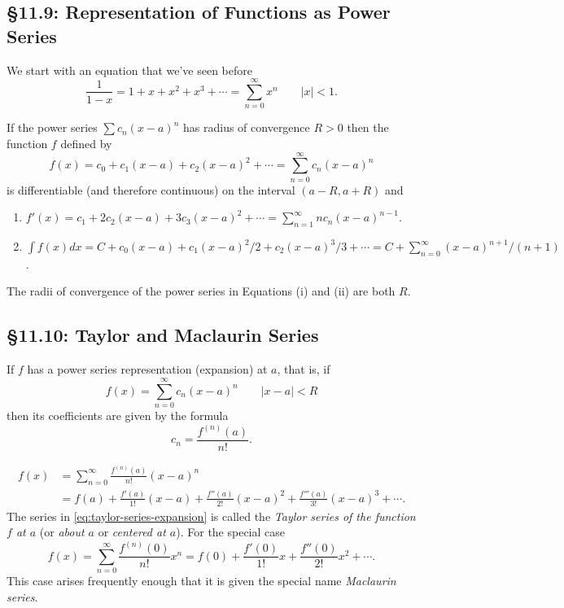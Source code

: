 \subsection{\S 11.9: Representation of Functions as Power Series}
We start with an equation that we've seen before
\begin{equation}
\label{eq:geometri-series-representation}
\frac{1}{1-x}=1+x+x^2+x^3+\dotsb=\sum_{n=0}^\infty x^n\qquad |x|<1.
\end{equation}
\begin{theorem}
If the power series $\sum c_n(x-a)^n$ has radius of convergence $R>0$ then
the function $f$ defined by
\[
f(x)=c_0+c_1(x-a)+c_2(x-a)^2+\dotsb=\sum_{n=0}^\infty c_n(x-a)^n
\]
is differentiable (and therefore continuous) on the interval $(a-R,a+R)$
and
\begin{enumerate}[label=\textnormal{(\roman*)}]
\item $f'(x)=c_1+2c_2(x-a)+3c_3(x-a)^2+\dotsb=\sum_{n=1}^\infty
  nc_n(x-a)^{n-1}$.
\item $\int
  f(x)dx=C+c_0(x-a)+c_1(x-a)^2/2+c_2(x-a)^3/3+\dotsb=C+\sum_{n=0}^\infty
  (x-a)^{n+1}/(n+1)$.
\end{enumerate}
The radii of convergence of the power series in Equations (i) and (ii) are
both $R$.
\end{theorem}

\subsection{\S 11.10: Taylor and Maclaurin Series}
\begin{theorem}
If $f$ has a power series representation (expansion) at $a$, that is, if
\[
f(x)=\sum_{n=0}^\infty c_n(x-a)^n\qquad |x-a|<R
\]
then its coefficients are given by the formula
\[
c_n=\frac{f^{(n)}(a)}{n!}.
\]
\end{theorem}

\begin{equation}
\label{eq:taylor-series-expansion}
\begin{aligned}
f(x)&=\sum_{n=0}^\infty\frac{f^{(n)}(a)}{n!}(x-a)^n\\
&=f(a)+\frac{f'(a)}{1!}(x-a)+\frac{f''(a)}{2!}(x-a)^2+\frac{f'''(a)}{3!}(x-a)^3+\dotsb.
\end{aligned}
\end{equation}
The series in \eqref{eq:taylor-series-expansion} is called the \emph{Taylor
series of the function $f$ at $a$} (or \emph{about $a$} or \emph{centered
at $a$}). For the special case
\[
f(x)=\sum_{n=0}^\infty\frac{f^{(n)}(0)}{n!}x^n=f(0)+\frac{f'(0)}{1!}x+\frac{f''(0)}{2!}x^2+\dotsb.
\]
This case arises frequently enough that it is given the special name
\emph{Maclaurin series}.

